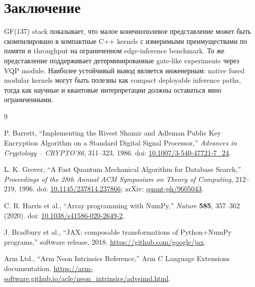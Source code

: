 \documentclass[11pt]{article}
\begin{document}
\section{Заключение}

GF(137) stack показывает, что малое конечнополевое представление может быть
скомпилировано в компактные C++ kernels с измеримыми преимуществами по памяти и
throughput на ограниченном edge-inference benchmark. То же представление
поддерживает детерминированные gate-like experiments через VQP module. Наиболее
устойчивый вывод является инженерным: native fused modular kernels могут быть
полезны как compact deployable inference paths, тогда как научные и квантовые
интерпретации должны оставаться явно ограниченными.

\begin{thebibliography}{9}

P. Barrett,
``Implementing the Rivest Shamir and Adleman Public Key Encryption Algorithm
on a Standard Digital Signal Processor,''
\emph{Advances in Cryptology -- CRYPTO'86}, 311--323, 1986.
doi: \href{https://doi.org/10.1007/3-540-47721-7_24}
{10.1007/3-540-47721-7\_24}.

L. K. Grover,
``A Fast Quantum Mechanical Algorithm for Database Search,''
\emph{Proceedings of the 28th Annual ACM Symposium on Theory of Computing},
212--219, 1996.
doi: \href{https://doi.org/10.1145/237814.237866}
{10.1145/237814.237866};
arXiv: \href{https://arxiv.org/abs/quant-ph/9605043}{quant-ph/9605043}.

C. R. Harris et al.,
``Array programming with NumPy,''
\emph{Nature} \textbf{585}, 357--362 (2020).
doi: \href{https://doi.org/10.1038/s41586-020-2649-2}
{10.1038/s41586-020-2649-2}.

J. Bradbury et al.,
``JAX: composable transformations of Python+NumPy programs,''
software release, 2018.
\url{https://github.com/google/jax}.

Arm Ltd.,
``Arm Neon Intrinsics Reference,''
Arm C Language Extensions documentation.
\url{https://arm-software.github.io/acle/neon_intrinsics/advsimd.html}.

\end{thebibliography}
\end{document}
